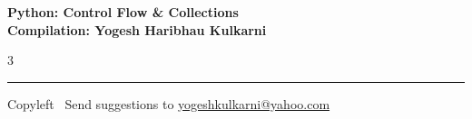 \documentclass[8pt,landscape]{article}
\begin{document}
\footnotesize


\begin{center}
\Large{\textbf{Python: Control Flow \& Collections\\ Compilation: Yogesh Haribhau Kulkarni}}
\end{center}

\begin{multicols}{3}

\end{multicols}

\rule{\linewidth}{0.25pt}
\scriptsize
Copyleft \textcopyleft\  Send suggestions to
\href{http://www.yogeshkulkarni.com}{yogeshkulkarni@yahoo.com}
\end{document}
